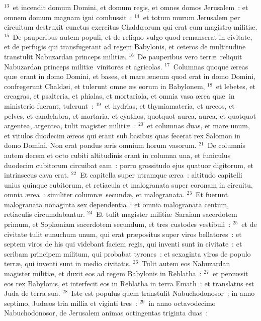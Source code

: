 ${}^{13}$~et incendit domum Domini, et domum regis, et omnes domos Jerusalem~: et omnem domum magnam igni combussit~:
${}^{14}$~et totum murum Jerusalem per circuitum destruxit cunctus exercitus Chald\ae orum qui erat cum magistro militi\ae .
${}^{15}$~De pauperibus autem populi, et de reliquo vulgo quod remanserat in civitate, et de perfugis qui transfugerant ad regem Babylonis, et ceteros de multitudine transtulit Nabuzardan princeps militi\ae .
${}^{16}$~De pauperibus vero terr\ae\ reliquit Nabuzardan princeps militi\ae\ vinitores et agricolas.
${}^{17}$~Columnas quoque \ae reas qu\ae\ erant in domo Domini, et bases, et mare \ae neum quod erat in domo Domini, confregerunt Chald\ae i, et tulerunt omne \ae s eorum in Babylonem,
${}^{18}$~et lebetes, et creagras, et psalteria, et phialas, et mortariola, et omnia vasa \ae rea qu\ae\ in ministerio fuerant, tulerunt~:
${}^{19}$~et hydrias, et thymiamateria, et urceos, et pelves, et candelabra, et mortaria, et cyathos, quotquot aurea, aurea, et quotquot argentea, argentea, tulit magister militi\ae~:
${}^{20}$~et columnas duas, et mare unum, et vitulos duodecim \ae reos qui erant sub basibus quas fecerat rex Salomon in domo Domini. Non erat pondus \ae ris omnium horum vasorum.
${}^{21}$~De columnis autem decem et octo cubiti altitudinis erant in columna una, et funiculus duodecim cubitorum circuibat eam~: porro grossitudo ejus quatuor digitorum, et intrinsecus cava erat.
${}^{22}$~Et capitella super utramque \ae rea~: altitudo capitelli unius quinque cubitorum, et retiacula et malogranata super coronam in circuitu, omnia \ae rea~: similiter column\ae\ secund\ae , et malogranata.
${}^{23}$~Et fuerunt malogranata nonaginta sex dependentia~: et omnia malogranata centum, retiaculis circumdabantur.
${}^{24}$~Et tulit magister militi\ae\ Saraiam sacerdotem primum, et Sophoniam sacerdotem secundum, et tres custodes vestibuli~:
${}^{25}$~et de civitate tulit eunuchum unum, qui erat pr\ae positus super viros bellatores~: et septem viros de his qui videbant faciem regis, qui inventi sunt in civitate~: et scribam principem militum, qui probabat tyrones~: et sexaginta viros de populo terr\ae , qui inventi sunt in medio civitatis.
${}^{26}$~Tulit autem eos Nabuzardan magister militi\ae , et duxit eos ad regem Babylonis in Reblatha~:
${}^{27}$~et percussit eos rex Babylonis, et interfecit eos in Reblatha in terra Emath~: et translatus est Juda de terra sua.
${}^{28}$~Iste est populus quem transtulit Nabuchodonosor~: in anno septimo, Jud\ae os tria millia et viginti tres~:
${}^{29}$~in anno octavodecimo Nabuchodonosor, de Jerusalem animas octingentas triginta duas~:
